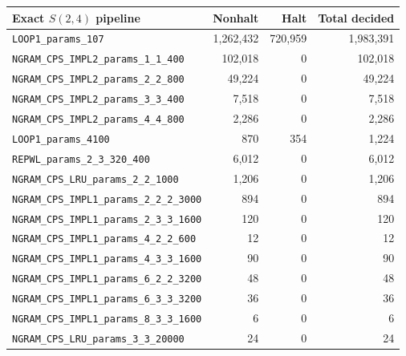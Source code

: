 \documentclass[letterpaper,british,11pt]{article}
\theoremstyle{definition} %
\numberwithin{equation}{section}
\theoremstyle{definition} %
\begin{document}
\begin{table}[h!]
    \centering
    \scriptsize
    \begin{tabular}{|lrrr|}
        \hline
        Exact $S(2,4)$ pipeline                           & Nonhalt       & Halt      & Total decided \\
        \hline
        \texttt{LOOP1\_params\_107}                       & 1{,}262{,}432 & 720{,}959 & 1{,}983{,}391 \\
        \texttt{NGRAM\_CPS\_IMPL2\_params\_1\_1\_400}     & 102{,}018     & 0         & 102{,}018     \\
        \texttt{NGRAM\_CPS\_IMPL2\_params\_2\_2\_800}     & 49{,}224      & 0         & 49{,}224      \\
        \texttt{NGRAM\_CPS\_IMPL2\_params\_3\_3\_400}     & 7{,}518       & 0         & 7{,}518       \\
        \texttt{NGRAM\_CPS\_IMPL2\_params\_4\_4\_800}     & 2{,}286       & 0         & 2{,}286       \\
        \texttt{LOOP1\_params\_4100}                      & 870           & 354       & 1{,}224       \\
        \texttt{REPWL\_params\_2\_3\_320\_400}            & 6{,}012       & 0         & 6{,}012       \\
        \texttt{NGRAM\_CPS\_LRU\_params\_2\_2\_1000}      & 1{,}206       & 0         & 1{,}206       \\
        \texttt{NGRAM\_CPS\_IMPL1\_params\_2\_2\_2\_3000} & 894           & 0         & 894           \\
        \texttt{NGRAM\_CPS\_IMPL1\_params\_2\_3\_3\_1600} & 120           & 0         & 120           \\
        \texttt{NGRAM\_CPS\_IMPL1\_params\_4\_2\_2\_600}  & 12            & 0         & 12            \\
        \texttt{NGRAM\_CPS\_IMPL1\_params\_4\_3\_3\_1600} & 90            & 0         & 90            \\
        \texttt{NGRAM\_CPS\_IMPL1\_params\_6\_2\_2\_3200} & 48            & 0         & 48            \\
        \texttt{NGRAM\_CPS\_IMPL1\_params\_6\_3\_3\_3200} & 36            & 0         & 36            \\
        \texttt{NGRAM\_CPS\_IMPL1\_params\_8\_3\_3\_1600} & 6             & 0         & 6             \\
        \texttt{NGRAM\_CPS\_LRU\_params\_3\_3\_20000}     & 24            & 0         & 24            \\

\end{tabular}
\end{table}
\end{document}
